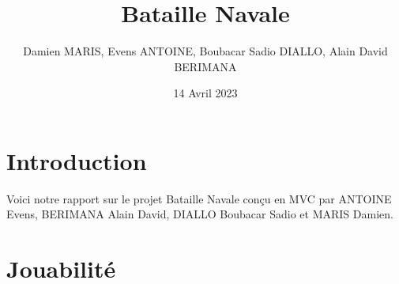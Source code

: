 \documentclass[12pt]{article}
\title{Bataille Navale}
\author{Damien MARIS, Evens ANTOINE, Boubacar Sadio DIALLO, Alain David BERIMANA}
\date{14 Avril 2023}
\begin{document}
\maketitle
\thispagestyle{empty}
\newpage
\clearpage
{} 
\tableofcontents
\newpage
\section{Introduction}
Voici notre rapport sur le projet Bataille Navale conçu en MVC par ANTOINE Evens, BERIMANA Alain David, DIALLO Boubacar Sadio et MARIS Damien.



\section{Jouabilité}
\end{document}
